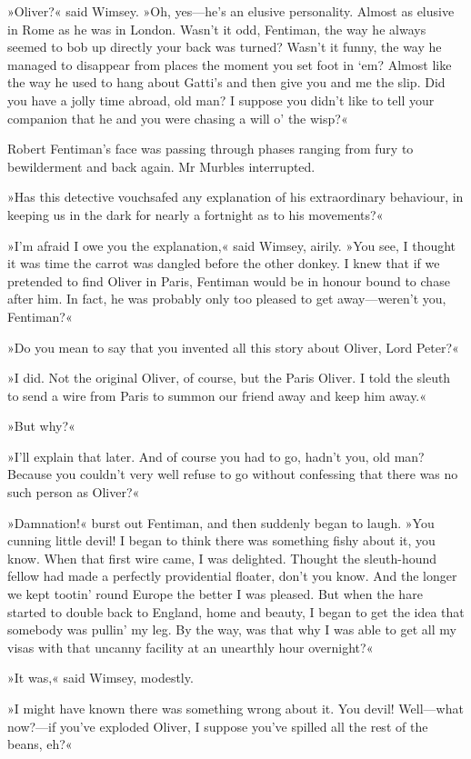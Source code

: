 »Oliver?« said Wimsey. »Oh, yes—he's an elusive personality. Almost as elusive in Rome as he was in London. Wasn't it odd, Fentiman, the way he always seemed to bob up directly your back was turned? Wasn't it funny, the way he managed to disappear from places the moment you set foot in `em? Almost like the way he used to hang about Gatti's and then give you and me the slip. Did you have a jolly time abroad, old man? I suppose you didn't like to tell your companion that he and you were chasing a will o' the wisp?«

Robert Fentiman's face was passing through phases ranging from fury to bewilderment and back again. Mr Murbles interrupted.

»Has this detective vouchsafed any explanation of his extraordinary behaviour, in keeping us in the dark for nearly a fortnight as to his movements?«

»I'm afraid I owe you the explanation,« said Wimsey, airily. »You see, I thought it was time the carrot was dangled before the other donkey. I knew that if we pretended to find Oliver in Paris, Fentiman would be in honour bound to chase after him. In fact, he was probably only too pleased to get away—weren't you, Fentiman?«

»Do you mean to say that you invented all this story about Oliver, Lord Peter?«

»I did. Not the original Oliver, of course, but the Paris Oliver. I told the sleuth to send a wire from Paris to summon our friend away and keep him away.«

»But why?«

»I'll explain that later. And of course you had to go, hadn't you, old man? Because you couldn't very well refuse to go without confessing that there was no such person as Oliver?«

»Damnation!« burst out Fentiman, and then suddenly began to laugh. »You cunning little devil! I began to think there was something fishy about it, you know. When that first wire came, I was delighted. Thought the sleuth-hound fellow had made a perfectly providential floater, don't you know. And the longer we kept tootin' round Europe the better I was pleased. But when the hare started to double back to England, home and beauty, I began to get the idea that somebody was pullin' my leg. By the way, was that why I was able to get all my visas with that uncanny facility at an unearthly hour overnight?«

»It was,« said Wimsey, modestly.

»I might have known there was something wrong about it. You devil! Well—what now?—if you've exploded Oliver, I suppose you've spilled all the rest of the beans, eh?«

